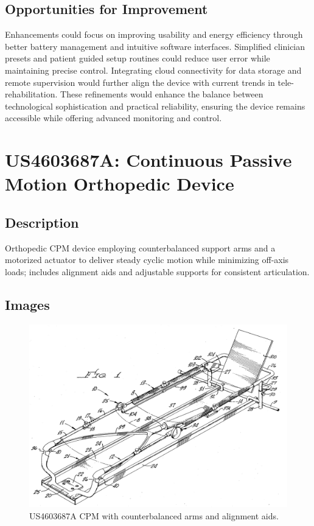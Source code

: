 \documentclass[11pt]{article}
\begin{document}
\subsection{Opportunities for Improvement}
Enhancements could focus on improving usability and energy efficiency through better battery management and intuitive software interfaces. Simplified clinician presets and patient guided setup routines could reduce user error while maintaining precise control. Integrating cloud connectivity for data storage and remote supervision would further align the device with current trends in tele-rehabilitation. These refinements would enhance the balance between technological sophistication and practical reliability, ensuring the device remains accessible while offering advanced monitoring and control.

\section{US4603687A: Continuous Passive Motion Orthopedic Device}
\subsection{Description}
Orthopedic CPM device employing counterbalanced support arms and a motorized actuator to deliver steady cyclic motion while minimizing off-axis loads; includes alignment aids and adjustable supports for consistent articulation.
\subsection{Images}
\begin{figure}[H]
  \centering
  \includegraphics[width=0.54\linewidth]{US4603687_1.png}
  \caption{US4603687A CPM with counterbalanced arms and alignment aids.}
  \label{fig:US4603687A}
\end{figure}
\end{document}
